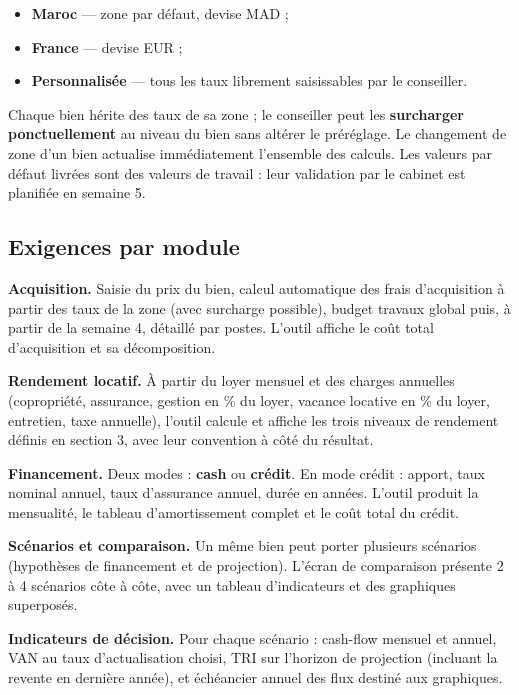 \documentclass[11pt,a4paper]{article}
\begin{document}
	\begin{itemize}
		\item \textbf{Maroc} — zone par défaut, devise MAD ;
		\item \textbf{France} — devise EUR ;
		\item \textbf{Personnalisée} — tous les taux librement saisissables par le conseiller.
	\end{itemize}

	Chaque bien hérite des taux de sa zone ; le conseiller peut les \textbf{surcharger ponctuellement} au niveau du bien sans altérer le préréglage. Le changement de zone d'un bien actualise immédiatement l'ensemble des calculs. Les valeurs par défaut livrées sont des valeurs de travail : leur validation par le cabinet est planifiée en semaine 5.

	\subsection{Exigences par module}

	\textbf{Acquisition.} Saisie du prix du bien, calcul automatique des frais d'acquisition à partir des taux de la zone (avec surcharge possible), budget travaux global puis, à partir de la semaine 4, détaillé par postes. L'outil affiche le coût total d'acquisition et sa décomposition.

	\textbf{Rendement locatif.} À partir du loyer mensuel et des charges annuelles (copropriété, assurance, gestion en \% du loyer, vacance locative en \% du loyer, entretien, taxe annuelle), l'outil calcule et affiche les trois niveaux de rendement définis en section 3, avec leur convention à côté du résultat.

	\textbf{Financement.} Deux modes : \textbf{cash} ou \textbf{crédit}. En mode crédit : apport, taux nominal annuel, taux d'assurance annuel, durée en années. L'outil produit la mensualité, le tableau d'amortissement complet et le coût total du crédit.

	\textbf{Scénarios et comparaison.} Un même bien peut porter plusieurs scénarios (hypothèses de financement et de projection). L'écran de comparaison présente 2 à 4 scénarios côte à côte, avec un tableau d'indicateurs et des graphiques superposés.

	\textbf{Indicateurs de décision.} Pour chaque scénario : cash-flow mensuel et annuel, VAN au taux d'actualisation choisi, TRI sur l'horizon de projection (incluant la revente en dernière année), et échéancier annuel des flux destiné aux graphiques.
\end{document}
